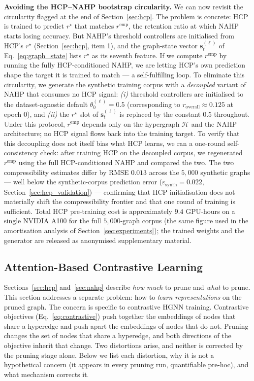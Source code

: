 \documentclass[10pt]{article}
\theoremstyle{plain}
\theoremstyle{definition}
\begin{document}
\textbf{Avoiding the HCP--NAHP bootstrap circularity.} We can now revisit the circularity flagged at the end of Section~\ref{sec:hcp}. The problem is concrete: HCP is trained to predict $r^{\star}$ that matches $r^{\mathrm{emp}}$, the retention ratio at which NAHP starts losing accuracy. But NAHP's threshold controllers are initialised from HCP's $r^{\star}$ (Section~\ref{sec:hcp}, item 1), and the graph-state vector $\mathbf{s}_t^{(\ell)}$ of Eq.~\eqref{eq:graph_state} lists $r^{\star}$ as its seventh feature. If we compute $r^{\mathrm{emp}}$ by running the fully HCP-conditioned NAHP, we are letting HCP's own prediction shape the target it is trained to match --- a self-fulfilling loop. To eliminate this circularity, we generate the synthetic training corpus with a \emph{decoupled} variant of NAHP that consumes no HCP signal: \emph{(i)} threshold controllers are initialised to the dataset-agnostic default $\theta_0^{(\ell)}\!=\!0.5$ (corresponding to $r_{\mathrm{overall}}\!\approx\!0.125$ at epoch $0$), and \emph{(ii)} the $r^{\star}$ slot of $\mathbf{s}_t^{(\ell)}$ is replaced by the constant $0.5$ throughout. Under this protocol, $r^{\mathrm{emp}}$ depends only on the hypergraph $\mathcal{H}$ and the NAHP architecture; no HCP signal flows back into the training target. To verify that this decoupling does not itself bias what HCP learns, we ran a one-round self-consistency check: after training HCP on the decoupled corpus, we regenerated $r^{\mathrm{emp}}$ using the full HCP-conditioned NAHP and compared the two. The two compressibility estimates differ by RMSE $0.013$ across the $5{,}000$ synthetic graphs --- well below the synthetic-corpus prediction error ($\varepsilon_{\mathrm{synth}}\!=\!0.022$, Section~\ref{sec:hcp_validation}) --- confirming that HCP initialisation does not materially shift the compressibility frontier and that one round of training is sufficient. Total HCP pre-training cost is approximately $9.4$ GPU-hours on a single NVIDIA A100 for the full $5{,}000$-graph corpus (the same figure used in the amortisation analysis of Section~\ref{sec:experiments}); the trained weights and the generator are released as anonymised supplementary material.

\subsection{Attention-Based Contrastive Learning}
\label{sec:contrastive}

Sections~\ref{sec:hcp} and~\ref{sec:nahp} describe \emph{how much} to prune and \emph{what} to prune. This section addresses a separate problem: how to \emph{learn representations} on the pruned graph. The concern is specific to contrastive HGNN training. Contrastive objectives (Eq.~\eqref{eq:contrastive}) push together the embeddings of nodes that share a hyperedge and push apart the embeddings of nodes that do not. Pruning changes the set of nodes that share a hyperedge, and both directions of the objective inherit that change. Two distortions arise, and neither is corrected by the pruning stage alone. Below we list each distortion, why it is not a hypothetical concern (it appears in every pruning run, quantifiable pre-hoc), and what mechanism corrects it.
\end{document}
